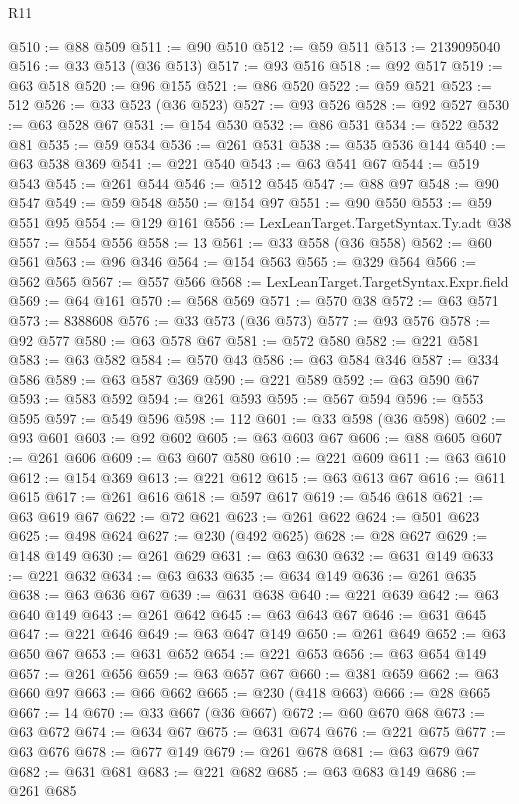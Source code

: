 \begin{lexlean}{R11}
\begin{coremodule}
@510 := @88 @509
@511 := @90 @510
@512 := @59 @511
@513 := 2139095040
@516 := @33 @513 (@36 @513)
@517 := @93 @516
@518 := @92 @517
@519 := @63 @518
@520 := @96 @155
@521 := @86 @520
@522 := @59 @521
@523 := 512
@526 := @33 @523 (@36 @523)
@527 := @93 @526
@528 := @92 @527
@530 := @63 @528 @67
@531 := @154 @530
@532 := @86 @531
@534 := @522 @532 @81
@535 := @59 @534
@536 := @261 @531
@538 := @535 @536 @144
@540 := @63 @538 @369
@541 := @221 @540
@543 := @63 @541 @67
@544 := @519 @543
@545 := @261 @544
@546 := @512 @545
@547 := @88 @97
@548 := @90 @547
@549 := @59 @548
@550 := @154 @97
@551 := @90 @550
@553 := @59 @551 @95
@554 := @129 @161
@556 := LexLeanTarget.TargetSyntax.Ty.adt @38
@557 := @554 @556
@558 := 13
@561 := @33 @558 (@36 @558)
@562 := @60 @561
@563 := @96 @346
@564 := @154 @563
@565 := @329 @564
@566 := @562 @565
@567 := @557 @566
@568 := LexLeanTarget.TargetSyntax.Expr.field
@569 := @64 @161
@570 := @568 @569
@571 := @570 @38
@572 := @63 @571
@573 := 8388608
@576 := @33 @573 (@36 @573)
@577 := @93 @576
@578 := @92 @577
@580 := @63 @578 @67
@581 := @572 @580
@582 := @221 @581
@583 := @63 @582
@584 := @570 @43
@586 := @63 @584 @346
@587 := @334 @586
@589 := @63 @587 @369
@590 := @221 @589
@592 := @63 @590 @67
@593 := @583 @592
@594 := @261 @593
@595 := @567 @594
@596 := @553 @595
@597 := @549 @596
@598 := 112
@601 := @33 @598 (@36 @598)
@602 := @93 @601
@603 := @92 @602
@605 := @63 @603 @67
@606 := @88 @605
@607 := @261 @606
@609 := @63 @607 @580
@610 := @221 @609
@611 := @63 @610
@612 := @154 @369
@613 := @221 @612
@615 := @63 @613 @67
@616 := @611 @615
@617 := @261 @616
@618 := @597 @617
@619 := @546 @618
@621 := @63 @619 @67
@622 := @72 @621
@623 := @261 @622
@624 := @501 @623
@625 := @498 @624
@627 := @230 (@492 @625)
@628 := @28 @627
@629 := @148 @149
@630 := @261 @629
@631 := @63 @630
@632 := @631 @149
@633 := @221 @632
@634 := @63 @633
@635 := @634 @149
@636 := @261 @635
@638 := @63 @636 @67
@639 := @631 @638
@640 := @221 @639
@642 := @63 @640 @149
@643 := @261 @642
@645 := @63 @643 @67
@646 := @631 @645
@647 := @221 @646
@649 := @63 @647 @149
@650 := @261 @649
@652 := @63 @650 @67
@653 := @631 @652
@654 := @221 @653
@656 := @63 @654 @149
@657 := @261 @656
@659 := @63 @657 @67
@660 := @381 @659
@662 := @63 @660 @97
@663 := @66 @662
@665 := @230 (@418 @663)
@666 := @28 @665
@667 := 14
@670 := @33 @667 (@36 @667)
@672 := @60 @670 @68
@673 := @63 @672
@674 := @634 @67
@675 := @631 @674
@676 := @221 @675
@677 := @63 @676
@678 := @677 @149
@679 := @261 @678
@681 := @63 @679 @67
@682 := @631 @681
@683 := @221 @682
@685 := @63 @683 @149
@686 := @261 @685

\end{coremodule}
\end{lexlean}
